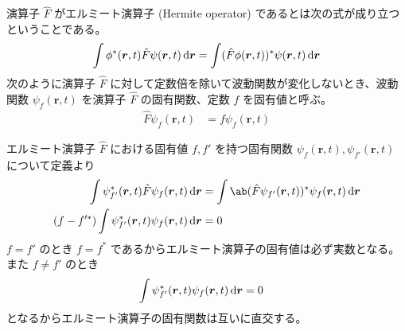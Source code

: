 \documentclass[uplatex,dvipdfmx,a4paper,11pt]{jlreq}
\newcommand{\rr}{\bm{r}}
\numberwithin{equation}{section}
\theoremstyle{definition}
\begin{document}
\begin{definition}
  演算子 $\hat{F}$ がエルミート演算子 (Hermite operator) であるとは次の式が成り立つということである。
  \begin{align}
    \int\phi^*(\rr, t)\hat{F}\psi(\rr, t)\dl{\rr} = \int(\hat{F}\phi(\rr, t))^*\psi(\rr, t)\dl{\rr}
  \end{align}
  次のように演算子 $\hat{F}$ に対して定数倍を除いて波動関数が変化しないとき、波動関数 $\psi_f(\rr, t)$ を演算子 $\hat{F}$ の固有関数、定数 $f$ を固有値と呼ぶ。
  \begin{align}
    \hat{F}\psi_f(\rr, t) & = f\psi_f(\rr, t)
  \end{align}
\end{definition}
エルミート演算子 $\hat{F}$ における固有値 $f, f'$ を持つ固有関数 $\psi_f(\rr, t), \psi_{f'}(\rr, t)$ について定義より
\begin{align}
  \int\psi_{f'}^*(\rr, t)\hat{F}\psi_f(\rr, t)\dl{\rr}    & = \int\ab(\hat{F}\psi_{f'}(\rr, t))^*\psi_f(\rr, t)\dl{\rr} \\
  (f - f'^*)\int\psi_{f'}^*(\rr, t)\psi_f(\rr, t)\dl{\rr} & = 0
\end{align}
$f = f'$ のとき $f = f^*$ であるからエルミート演算子の固有値は必ず実数となる。
また $f \neq f'$ のとき
\begin{align}
  \int\psi_{f'}^*(\rr, t)\psi_f(\rr, t)\dl{\rr} & = 0
\end{align}
となるからエルミート演算子の固有関数は互いに直交する。
\end{document}
